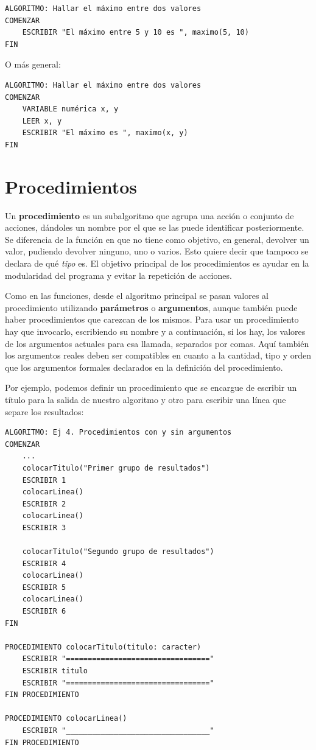 \documentclass[]{book}
\begin{document}
\begin{verbatim}
ALGORITMO: Hallar el máximo entre dos valores
COMENZAR
    ESCRIBIR "El máximo entre 5 y 10 es ", maximo(5, 10)
FIN
\end{verbatim}

O más general:

\begin{verbatim}
ALGORITMO: Hallar el máximo entre dos valores
COMENZAR
    VARIABLE numérica x, y
    LEER x, y
    ESCRIBIR "El máximo es ", maximo(x, y)
FIN
\end{verbatim}

\section{Procedimientos}\label{procedimientos}

Un \textbf{procedimiento} es un subalgoritmo que agrupa una acción o
conjunto de acciones, dándoles un nombre por el que se las puede
identificar posteriormente. Se diferencia de la función en que no tiene
como objetivo, en general, devolver un valor, pudiendo devolver ninguno,
uno o varios. Esto quiere decir que tampoco se declara de qué
\emph{tipo} es. El objetivo principal de los procedimientos es ayudar en
la modularidad del programa y evitar la repetición de acciones.

Como en las funciones, desde el algoritmo principal se pasan valores al
procedimiento utilizando \textbf{parámetros} o \textbf{argumentos},
aunque también puede haber procedimientos que carezcan de los mismos.
Para usar un procedimiento hay que invocarlo, escribiendo su nombre y a
continuación, si los hay, los valores de los argumentos actuales para
esa llamada, separados por comas. Aquí también los argumentos reales
deben ser compatibles en cuanto a la cantidad, tipo y orden que los
argumentos formales declarados en la definición del procedimiento.

Por ejemplo, podemos definir un procedimiento que se encargue de
escribir un título para la salida de nuestro algoritmo y otro para
escribir una línea que separe los resultados:

\begin{verbatim}
ALGORITMO: Ej 4. Procedimientos con y sin argumentos
COMENZAR
    ...
    colocarTitulo("Primer grupo de resultados")
    ESCRIBIR 1
    colocarLinea()
    ESCRIBIR 2
    colocarLinea()
    ESCRIBIR 3

    colocarTitulo("Segundo grupo de resultados")
    ESCRIBIR 4
    colocarLinea()
    ESCRIBIR 5
    colocarLinea()
    ESCRIBIR 6
FIN

PROCEDIMIENTO colocarTitulo(titulo: caracter)
    ESCRIBIR "================================="
    ESCRIBIR titulo
    ESCRIBIR "================================="
FIN PROCEDIMIENTO

PROCEDIMIENTO colocarLinea()
    ESCRIBIR "_________________________________"
FIN PROCEDIMIENTO
\end{verbatim}
\end{document}
